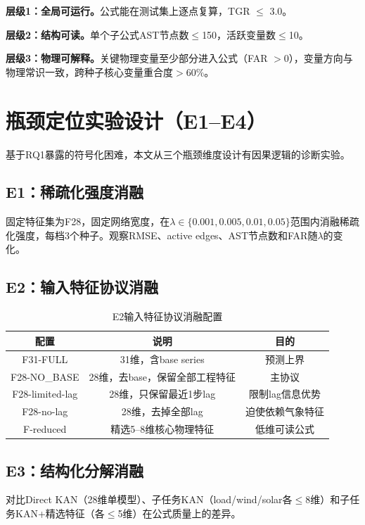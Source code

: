 \documentclass[12pt,a4paper,oneside]{ctexbook}
\begin{document}
\textbf{层级1：全局可运行。}公式能在测试集上逐点复算，TGR $\leq$ 3.0。

\textbf{层级2：结构可读。}单个子公式AST节点数$\leq$150，活跃变量数$\leq$10。

\textbf{层级3：物理可解释。}关键物理变量至少部分进入公式（FAR $> 0$），变量方向与物理常识一致，跨种子核心变量重合度$> 60\%$。

\section{瓶颈定位实验设计（E1--E4）}

基于RQ1暴露的符号化困难，本文从三个瓶颈维度设计有因果逻辑的诊断实验。

\subsection{E1：稀疏化强度消融}

固定特征集为F28，固定网络宽度，在$\lambda \in \{0.001, 0.005, 0.01, 0.05\}$范围内消融稀疏化强度，每档3个种子。观察RMSE、active edges、AST节点数和FAR随$\lambda$的变化。

\subsection{E2：输入特征协议消融}

\begin{table}[htbp]
\centering
\caption{E2输入特征协议消融配置}
\label{tab:e2-config}
\begin{tabular}{ccc}
\toprule
配置 & 说明 & 目的 \\
\midrule
F31-FULL & 31维，含base series & 预测上界 \\
F28-NO\_BASE & 28维，去base，保留全部工程特征 & 主协议 \\
F28-limited-lag & 28维，只保留最近1步lag & 限制lag信息优势 \\
F28-no-lag & 28维，去掉全部lag & 迫使依赖气象特征 \\
F-reduced & 精选5--8维核心物理特征 & 低维可读公式 \\
\bottomrule
\end{tabular}
\end{table}

\subsection{E3：结构化分解消融}

对比Direct KAN（28维单模型）、子任务KAN（load/wind/solar各$\leq$8维）和子任务KAN+精选特征（各$\leq$5维）在公式质量上的差异。
\end{document}
